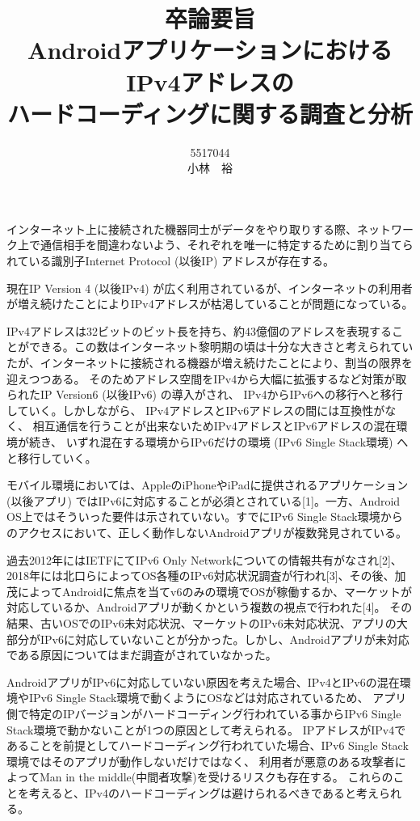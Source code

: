 \documentclass[twocolumn, 10pt, a4paper]{jarticle}
\title{\vspace{-3cm}
{\large 卒論要旨}\\
{\bf
AndroidアプリケーションにおけるIPv4アドレスの\\ハードコーディングに関する調査と分析
}
}
\author{
5517044 \\		%
小林　裕		%
}
\date{}
\begin{document}
\maketitle
\thispagestyle{empty}

インターネット上に接続された機器同士がデータをやり取りする際、ネットワーク上で通信相手を間違わないよう、それぞれを唯一に特定するために割り当てられている識別子Internet Protocol (以後IP) アドレスが存在する。

現在IP Version 4 (以後IPv4) が広く利用されているが、インターネットの利用者が増え続けたことによりIPv4アドレスが枯渇していることが問題になっている。

IPv4アドレスは32ビットのビット長を持ち、約43億個のアドレスを表現することができる。この数はインターネット黎明期の頃は十分な大きさと考えられていたが、インターネットに接続される機器が増え続けたことにより、割当の限界を迎えつつある。
そのためアドレス空間をIPv4から大幅に拡張するなど対策が取られたIP Version6 (以後IPv6) の導入がされ、
IPv4からIPv6への移行へと移行していく。しかしながら、
IPv4アドレスとIPv6アドレスの間には互換性がなく、
相互通信を行うことが出来ないためIPv4アドレスとIPv6アドレスの混在環境が続き、
いずれ混在する環境からIPv6だけの環境 (IPv6 Single Stack環境) へと移行していく。

モバイル環境においては、AppleのiPhoneやiPadに提供されるアプリケーション (以後アプリ) ではIPv6に対応することが必須とされている[1]。一方、Android OS上ではそういった要件は示されていない。すでにIPv6 Single Stack環境からのアクセスにおいて、正しく動作しないAndroidアプリが複数発見されている。

過去2012年にはIETFにてIPv6 Only Networkについての情報共有がなされ[2]、2018年には北口らによってOS各種のIPv6対応状況調査が行われ[3]、その後、加茂によってAndroidに焦点を当てv6のみの環境でOSが稼働するか、マーケットが対応しているか、Androidアプリが動くかという複数の視点で行われた[4]。
その結果、古いOSでのIPv6未対応状況、マーケットのIPv6未対応状況、アプリの大部分がIPv6に対応していないことが分かった。しかし、Androidアプリが未対応である原因についてはまだ調査がされていなかった。

AndroidアプリがIPv6に対応していない原因を考えた場合、IPv4とIPv6の混在環境やIPv6 Single Stack環境で動くようにOSなどは対応されているため、
アプリ側で特定のIPバージョンがハードコーディング行われている事からIPv6 Single Stack環境で動かないことが1つの原因として考えられる。
IPアドレスがIPv4であることを前提としてハードコーディング行われていた場合、IPv6 Single Stack環境ではそのアプリが動作しないだけではなく、
利用者が悪意のある攻撃者によってMan in the middle(中間者攻撃)を受けるリスクも存在する。
これらのことを考えると、IPv4のハードコーディングは避けられるべきであると考えられる。
\end{document}

